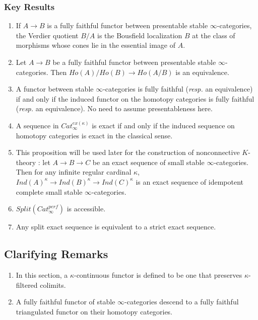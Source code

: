 \documentclass[letterpaper]{article}
\theoremstyle{definition}
\begin{document}
\subsubsection{Key Results}

\begin{enumerate}
\item If $A \rightarrow B$ is a fully faithful functor between presentable stable $\infty$-categories, the Verdier quotient $B/A$ is the Bousfield localization $B$ at the class of morphisms whose cones lie in the essential image of $A$. 
\item Let $A \rightarrow B$ be a fully faithful functor between presentable stable $\infty$-categories. Then $Ho(A)/Ho(B) \rightarrow Ho(A/B)$ is an equivalence. 
\item A functor between stable $\infty$-categories is fully faithful (\textit{resp.} an equivalence) if and only if the induced functor on the homotopy categories is fully faithful (\textit{resp.} an equivalence). No need to assume presentableness here. 
\item A sequence in $Cat_\infty^{ex(\kappa)}$ is exact if and only if the induced sequence on homotopy categories is exact in the classical sense. 
\item This proposition will be used later for the construction of nonconnective $K$-theory : let $A \rightarrow B \rightarrow C$ be an exact sequence of small stable $\infty$-categories. Then for any infinite regular cardinal $\kappa$, $Ind(A)^\kappa \rightarrow Ind(B)^\kappa \rightarrow Ind(C)^\kappa$ is an exact sequence of idempotent complete small stable $\infty$-categories.
\item $Split(Cat_\infty^{perf})$ is accessible. 
\item Any split exact sequence is equivalent to a strict exact sequence.
\end{enumerate}

\subsection{Clarifying Remarks}

\begin{enumerate}
\item In this section, a $\kappa$-continuous functor is defined to be one that preserves $\kappa$-filtered colimits. 
\item A fully faithful functor of stable $\infty$-categories descend to a fully faithful triangulated functor on their homotopy categories. 
\end{enumerate}
\end{document}
